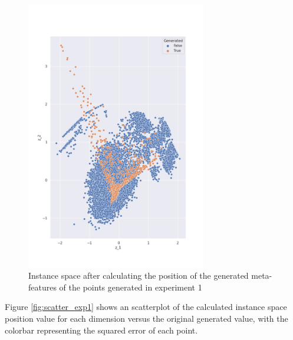\begin{figure}[H]
    \centering
    \includegraphics[width=0.7\textwidth]{Cap5/all_coords1.png}
    \caption{Instance space after calculating the position of the generated meta-features of the points generated in experiment 1}
    \label{fig:is_exp1}
\end{figure}

Figure \ref{fig:scatter_exp1} shows an scatterplot of the calculated instance space position value for each dimension versus the original generated value, with the colorbar representing the squared error of each point.

